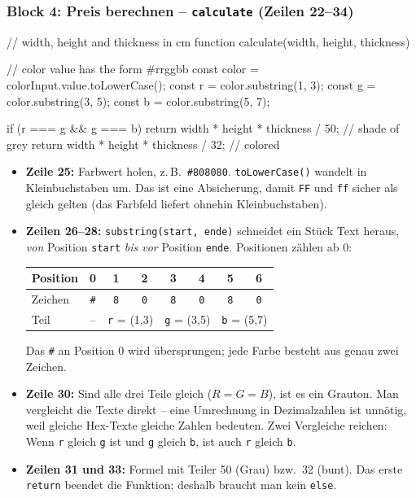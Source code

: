 \documentclass[a4paper,11pt]{article}
\begin{document}
\subsubsection*{Block 4: Preis berechnen -- \texttt{calculate} (Zeilen 22--34)}
\begin{code}[firstnumber=22]
// width, height and thickness in cm
function calculate(width, height, thickness) {
    // color value has the form #rrggbb
    const color = colorInput.value.toLowerCase();
    const r = color.substring(1, 3);
    const g = color.substring(3, 5);
    const b = color.substring(5, 7);

    if (r === g && g === b) {
        return width * height * thickness / 50; // shade of grey
    }
    return width * height * thickness / 32; // colored
}
\end{code}
\begin{itemize}
\item \textbf{Zeile 25:} Farbwert holen, z.\,B.\ \texttt{\textquotedbl{}\#808080\textquotedbl{}}. \texttt{toLowerCase()} wandelt in Kleinbuchstaben um. Das ist eine Absicherung, damit
      \texttt{\textquotedbl{}FF\textquotedbl{}} und \texttt{\textquotedbl{}ff\textquotedbl{}} sicher als gleich gelten (das Farbfeld liefert ohnehin Kleinbuchstaben).
\item \textbf{Zeilen 26--28:} \lstinline|substring(start, ende)| schneidet ein Stück Text heraus, \emph{von} Position
      \texttt{start} \emph{bis vor} Position \texttt{ende}. Positionen zählen ab 0:
      \begin{center}
      \begin{tabular}{@{}lccccccc@{}}
      \toprule
      Position & 0 & 1 & 2 & 3 & 4 & 5 & 6\\
      \midrule
      Zeichen  & \texttt{\#} & \texttt{8} & \texttt{0} & \texttt{8} & \texttt{0} & \texttt{8} & \texttt{0}\\
      Teil     & -- & \multicolumn{2}{c}{\texttt{r} = (1,3)} & \multicolumn{2}{c}{\texttt{g} = (3,5)} & \multicolumn{2}{c}{\texttt{b} = (5,7)}\\
      \bottomrule
      \end{tabular}
      \end{center}
      Das \texttt{\#} an Position 0 wird übersprungen; jede Farbe besteht aus genau zwei Zeichen.
\item \textbf{Zeile 30:} Sind alle drei Teile gleich ($R = G = B$), ist es ein Grauton. Man vergleicht die Texte
      direkt -- eine Umrechnung in Dezimalzahlen ist unnötig, weil gleiche Hex-Texte gleiche Zahlen bedeuten.
      Zwei Vergleiche reichen: Wenn \texttt{r} gleich \texttt{g} ist und \texttt{g} gleich \texttt{b}, ist auch \texttt{r} gleich \texttt{b}.
\item \textbf{Zeilen 31 und 33:} Formel mit Teiler 50 (Grau) bzw.\ 32 (bunt). Das erste \texttt{return} beendet die
      Funktion; deshalb braucht man kein \texttt{else}.
\end{itemize}
\end{document}
